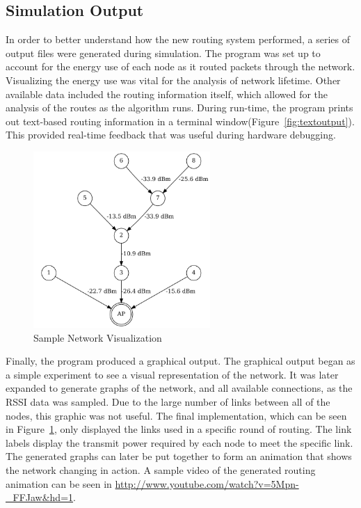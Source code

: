 \documentclass{article}
\begin{document}
\subsection{Simulation Output}
In order to better understand how the new routing system performed, a series of output files were generated during simulation. The program was set up to account for the energy use of each node as it routed packets through the network. Visualizing the energy use was vital for the analysis of network lifetime. Other available data included the routing information itself, which allowed for the analysis of the routes as the algorithm runs. During run-time, the program prints out text-based routing information in a terminal window(Figure~\ref{fig:textoutput}). This provided real-time feedback that was useful during hardware debugging.

\begin{figure}[htb]
\begin{center}
\includegraphics[width=0.6\textwidth]{figures/networkgraph1.pdf}
\end{center}
\caption{Sample Network Visualization}
\label{fig:networkgraph1}
\end{figure}

Finally, the program produced a graphical output. The graphical output began as a simple experiment to see a visual representation of the network. It was later expanded to generate graphs of the network, and all available connections, as the RSSI data was sampled. Due to the large number of links between all of the nodes, this graphic was not useful. The final implementation, which can be seen in Figure~\ref{fig:networkgraph1}, only displayed the links used in a specific round of routing. The link labels display the transmit power required by each node to meet the specific link. The generated graphs can later be put together to form an animation that shows the network changing in action. A sample video of the generated routing animation can be seen in \url{http://www.youtube.com/watch?v=5Mpn-_FFJaw&hd=1}.
\end{document}
